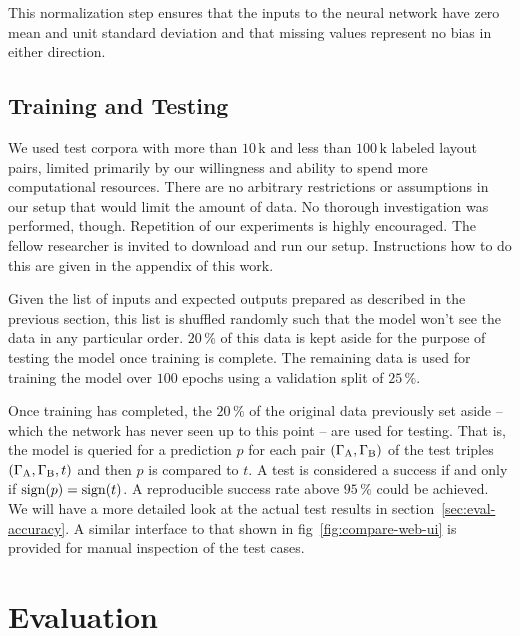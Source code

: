 \documentclass{graphstudy}
\begin{document}
This normalization step ensures that the inputs to the neural network have zero mean and unit standard deviation and
that missing values represent no bias in either direction.

\section{Training and Testing}
\label{sec:training-testing}

We used test corpora with more than \(10\,\mathrm{k}\) and less than \(100\,\mathrm{k}\) labeled layout pairs, limited
primarily by our willingness and ability to spend more computational resources.  There are no arbitrary restrictions or
assumptions in our setup that would limit the amount of data.  No thorough investigation was performed, though.
Repetition of our experiments is highly encouraged.  The fellow researcher is invited to download and run our setup.
Instructions how to do this are given in the appendix of this work.

Given the list of inputs and expected outputs prepared as described in the previous section, this list is shuffled
randomly such that the model won't see the data in any particular order.  \(20\,\%\) of this data is kept aside for the
purpose of testing the model once training is complete.  The remaining data is used for training the model over \(100\)
epochs using a validation split of \(25\,\%\).

Once training has completed, the \(20\,\%\) of the original data previously set aside -- which the network has never
seen up to this point -- are used for testing.  That is, the model is queried for a prediction \(p\) for each pair
\((\Gamma_\mathrm{A},\Gamma_\mathrm{B})\) of the test triples \((\Gamma_\mathrm{A},\Gamma_\mathrm{B},t)\) and then
\(p\) is compared to \(t\).  A test is considered a success if and only if \(\operatorname{sign}(p)=\operatorname{sign}(t)\).  A reproducible
success rate above \(95\,\%\) could be achieved.  We will have a more detailed look at the actual test results in
\acl{section}~\ref{sec:eval-accuracy}.  A similar interface to that shown in \acl{fig}~\ref{fig:compare-web-ui} is
provided for manual inspection of the test cases.

\chapter{Evaluation}
\label{chap:eval}
\end{document}

